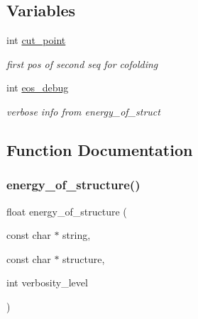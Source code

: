 \subsection*{Variables}
\begin{DoxyCompactItemize}
\item 
\mbox{\label{group__eval__deprecated_gab9b2c3a37a5516614c06d0ab54b97cda}} 
int \hyperlink{group__eval__deprecated_gab9b2c3a37a5516614c06d0ab54b97cda}{cut\+\_\+point}
\begin{DoxyCompactList}\small\item\em first pos of second seq for cofolding \end{DoxyCompactList}\item 
\mbox{\label{group__eval__deprecated_ga567530678f6260a1a649a5beca5da4c5}} 
int \hyperlink{group__eval__deprecated_ga567530678f6260a1a649a5beca5da4c5}{eos\+\_\+debug}
\begin{DoxyCompactList}\small\item\em verbose info from energy\+\_\+of\+\_\+struct \end{DoxyCompactList}\end{DoxyCompactItemize}


\subsection{Function Documentation}
\mbox{\label{group__eval__deprecated_gaf93986cb3cb29770ec9cca69c9fab8cf}} 
\subsubsection{\texorpdfstring{energy\+\_\+of\+\_\+structure()}{energy\_of\_structure()}}
{\footnotesize\ttfamily float energy\+\_\+of\+\_\+structure (\begin{DoxyParamCaption}\item[{const char $\ast$}]{string,  }\item[{const char $\ast$}]{structure,  }\item[{int}]{verbosity\+\_\+level }\end{DoxyParamCaption})}



